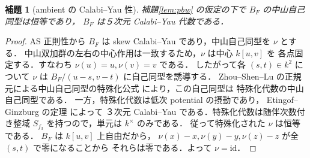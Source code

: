 \documentclass[11pt,a4paper]{ltjsarticle}
\numberwithin{equation}{section}
\newtheorem{lemma}[theorem]{補題}
\begin{document}
\begin{lemma}[ambient の Calabi--Yau 性]\label{lem:CY}
補題\ref{lem:pbw} の仮定の下で $B_F$ の中山自己同型は恒等であり，
$B_F$ は５次元 Calabi--Yau 代数である．
\end{lemma}
\begin{proof}
AS 正則性から $B_F$ は skew Calabi--Yau であり，中山自己同型を $\nu$ とする．
中山双加群の左右の中心作用は一致するため，$\nu$ は中心 $k[u,v]$ を
各点固定する．すなわち $\nu(u)=u,\nu(v)=v$ である．
したがって各 $(s,t)\in k^2$ について $\nu$ は
$B_F/(u-s,v-t)$ に自己同型を誘導する．
Zhou--Shen--Lu の正規元による中山自己同型の特殊化公式
\cite[Propositions~2.6, 3.6]{ZSL} により，この自己同型は
特殊化代数の中山自己同型である．
一方，特殊化代数は低次 potential の摂動であり，
Etingof--Ginzburg の定理\cite[Theorem~3.3.2(i)]{EG} によって
３次元 Calabi--Yau である．特殊化代数は随伴次数付き整域
$S_{f_3}$ を持つので，単元は $k^\times$ のみである．
従って特殊化された $\nu$ は恒等である．
$B_F$ は $k[u,v]$ 上自由だから，
$\nu(x)-x,\nu(y)-y,\nu(z)-z$ が全 $(s,t)$ で零になることから
それらは零である．よって $\nu=\mathrm{id}$．
\end{proof}
\end{document}
